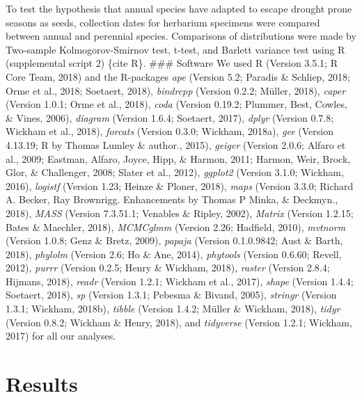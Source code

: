 \documentclass[man,floatsintext]{apa6}
\theoremstyle{definition}
\theoremstyle{definition}
\theoremstyle{definition}
\theoremstyle{remark}
\begin{document}
To test the hypothesis that annual species have adapted to escape
drought prone seasons as seeds, collection dates for herbarium specimens
were compared between annual and perennial species. Comparisons of
distributions were made by Two-sample Kolmogorov-Smirnov test, t-test,
and Barlett variance test using R (supplemental script 2) \{cite R\}.
\#\#\# Software We used R (Version 3.5.1; R Core Team, 2018) and the
R-packages \emph{ape} (Version 5.2; Paradis \& Schliep, 2018; Orme et
al., 2018; Soetaert, 2018), \emph{bindrcpp} (Version 0.2.2; Müller,
2018), \emph{caper} (Version 1.0.1; Orme et al., 2018), \emph{coda}
(Version 0.19.2; Plummer, Best, Cowles, \& Vines, 2006), \emph{diagram}
(Version 1.6.4; Soetaert, 2017), \emph{dplyr} (Version 0.7.8; Wickham et
al., 2018), \emph{forcats} (Version 0.3.0; Wickham, 2018a), \emph{gee}
(Version 4.13.19; R by Thomas Lumley \& author., 2015), \emph{geiger}
(Version 2.0.6; Alfaro et al., 2009; Eastman, Alfaro, Joyce, Hipp, \&
Harmon, 2011; Harmon, Weir, Brock, Glor, \& Challenger, 2008; Slater et
al., 2012), \emph{ggplot2} (Version 3.1.0; Wickham, 2016),
\emph{logistf} (Version 1.23; Heinze \& Ploner, 2018), \emph{maps}
(Version 3.3.0; Richard A. Becker, Ray Brownrigg. Enhancements by Thomas
P Minka, \& Deckmyn., 2018), \emph{MASS} (Version 7.3.51.1; Venables \&
Ripley, 2002), \emph{Matrix} (Version 1.2.15; Bates \& Maechler, 2018),
\emph{MCMCglmm} (Version 2.26; Hadfield, 2010), \emph{mvtnorm} (Version
1.0.8; Genz \& Bretz, 2009), \emph{papaja} (Version 0.1.0.9842; Aust \&
Barth, 2018), \emph{phylolm} (Version 2.6; Ho \& Ane, 2014),
\emph{phytools} (Version 0.6.60; Revell, 2012), \emph{purrr} (Version
0.2.5; Henry \& Wickham, 2018), \emph{raster} (Version 2.8.4; Hijmans,
2018), \emph{readr} (Version 1.2.1; Wickham et al., 2017), \emph{shape}
(Version 1.4.4; Soetaert, 2018), \emph{sp} (Version 1.3.1; Pebesma \&
Bivand, 2005), \emph{stringr} (Version 1.3.1; Wickham, 2018b),
\emph{tibble} (Version 1.4.2; Müller \& Wickham, 2018), \emph{tidyr}
(Version 0.8.2; Wickham \& Henry, 2018), and \emph{tidyverse} (Version
1.2.1; Wickham, 2017) for all our analyses.

\hypertarget{results}{%
\section{Results}\label{results}}
\end{document}
